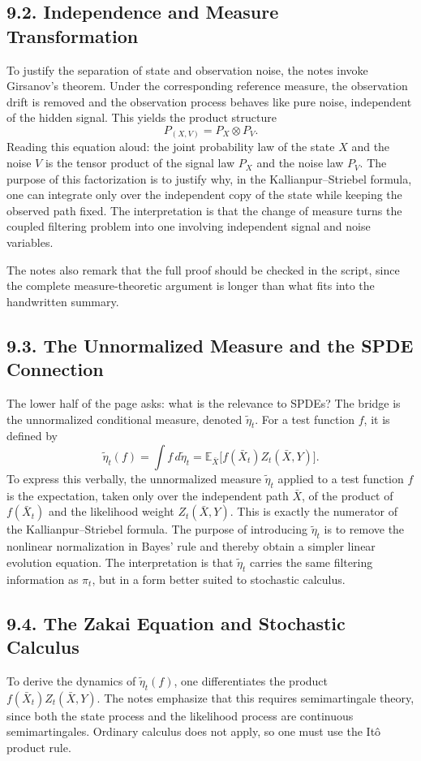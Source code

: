\documentclass[11pt]{article}
\theoremstyle{definition}
\theoremstyle{remark}
\begin{document}
\subsection*{9.2. Independence and Measure Transformation}
To justify the separation of state and observation noise, the notes invoke Girsanov's theorem. Under the corresponding reference measure, the observation drift is removed and the observation process behaves like pure noise, independent of the hidden signal. This yields the product structure
\[
P_{(X,V)}=P_X\otimes P_V.
\]
Reading this equation aloud: the joint probability law of the state $X$ and the noise $V$ is the tensor product of the signal law $P_X$ and the noise law $P_V$. The purpose of this factorization is to justify why, in the Kallianpur--Striebel formula, one can integrate only over the independent copy of the state while keeping the observed path fixed.
The interpretation is that the change of measure turns the coupled filtering problem into one involving independent signal and noise variables.

The notes also remark that the full proof should be checked in the script, since the complete measure-theoretic argument is longer than what fits into the handwritten summary.

\subsection*{9.3. The Unnormalized Measure and the SPDE Connection}
The lower half of the page asks: what is the relevance to SPDEs? The bridge is the unnormalized conditional measure, denoted $\tilde \eta_t$. For a test function $f$, it is defined by
\[
\tilde \eta_t(f)
=
\int f\,d\tilde \eta_t
=
\mathbb E_{\bar X}\bigl[f(\bar X_t)Z_t(\bar X,Y)\bigr].
\]
To express this verbally, the unnormalized measure $\tilde \eta_t$ applied to a test function $f$ is the expectation, taken only over the independent path $\bar X$, of the product of $f(\bar X_t)$ and the likelihood weight $Z_t(\bar X,Y)$. This is exactly the numerator of the Kallianpur--Striebel formula. The purpose of introducing $\tilde \eta_t$ is to remove the nonlinear normalization in Bayes' rule and thereby obtain a simpler linear evolution equation.
The interpretation is that $\tilde \eta_t$ carries the same filtering information as $\pi_t$, but in a form better suited to stochastic calculus.

\subsection*{9.4. The Zakai Equation and Stochastic Calculus}
To derive the dynamics of $\tilde \eta_t(f)$, one differentiates the product $f(\bar X_t)Z_t(\bar X,Y)$. The notes emphasize that this requires semimartingale theory, since both the state process and the likelihood process are continuous semimartingales. Ordinary calculus does not apply, so one must use the It\^o product rule.
\end{document}
